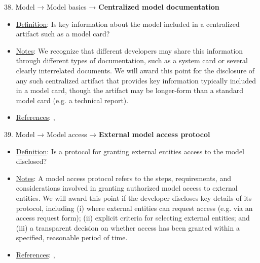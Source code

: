 38. Model → Model basics → \textbf{Centralized model documentation}
\vspace{-\parskip}
\begin{itemize}
\item
\underline{Definition}: Is key information about the model included in a centralized artifact such as a model card?
\item
\underline{Notes}: We recognize that different developers may share this information through different types of documentation, such as a system card or several clearly interrelated documents. We will award this point for the disclosure of any such centralized artifact that provides key information typically included in a model card, though the artifact may be longer-form than a standard model card (e.g. a technical report).
\item
\underline{References}: \citet{mitchell2019model}, \citet{crisan2022interactive}
\end{itemize}


39. Model → Model access → \textbf{External model access protocol}
\vspace{-\parskip}
\begin{itemize}
\item
\underline{Definition}: Is a protocol for granting external entities access to the model disclosed?
\item
\underline{Notes}: A model access protocol refers to the steps, requirements, and considerations involved in granting authorized model access to external entities. We will award this point if the developer discloses key details of its protocol, including (i) where external entities can request access (e.g. via an access request form); (ii) explicit criteria for selecting external entities; and (iii) a transparent decision on whether access has been granted within a specified, reasonable period of time.
\item
\underline{References}: \citet{solaiman2023gradient}, \citet{shevlane2022structured}
\end{itemize}


